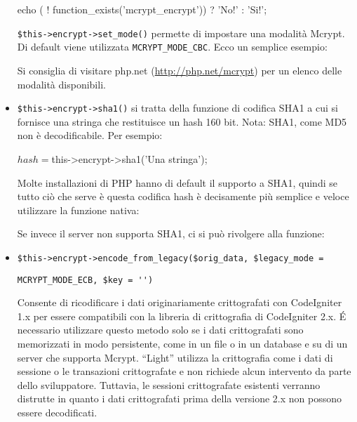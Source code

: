 \begin{itemize}
\begin{code}
echo ( ! function_exists('mcrypt_encrypt')) ? 'No!' : 'Si!';
\end{code}

\verb|$this->encrypt->set_mode()| permette di impostare una modalità Mcrypt. Di default viene utilizzata \verb|MCRYPT_MODE_CBC|. Ecco un semplice esempio:


Si consiglia di visitare php.net (\url{http://php.net/mcrypt}) per un elenco delle modalità disponibili.

\item \verb|$this->encrypt->sha1()| si tratta della funzione di codifica SHA1 a cui si fornisce una stringa che restituisce un hash 160 bit. Nota: SHA1, come MD5 non è decodificabile. Per esempio:

\begin{code}
$hash = $this->encrypt->sha1('Una stringa');
\end{code}

Molte installazioni di \ac{PHP} hanno di default il supporto a SHA1, quindi se tutto ciò che serve è questa codifica hash è decisamente più semplice e veloce utilizzare la funzione nativa:


Se invece il server non supporta SHA1, ci si può rivolgere alla funzione:

\item \verb|$this->encrypt->encode_from_legacy($orig_data, $legacy_mode = | 

\verb|MCRYPT_MODE_ECB, $key = '')|

Consente di ricodificare i dati originariamente crittografati con CodeIgniter 1.x per essere compatibili con la libreria di crittografia di CodeIgniter 2.x. \'E necessario utilizzare questo metodo solo se i dati crittografati sono memorizzati in modo persistente, come in un file o in un database e su di un server che supporta Mcrypt. ``Light'' utilizza la crittografia come i dati di sessione o le transazioni crittografate e non richiede alcun intervento da parte dello sviluppatore. Tuttavia, le sessioni crittografate esistenti verranno distrutte in quanto i dati crittografati prima della versione 2.x non possono essere decodificati.


\end{itemize}
